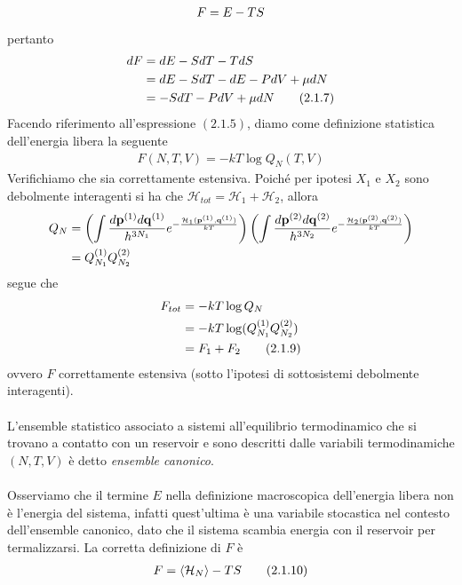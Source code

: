\documentclass{article}
\begin{document}
\begin{align}
    F = E - TS \notag
\end{align}
pertanto 
\begin{align}
    dF &= dE - SdT - TdS \notag \\
    &= dE - SdT -dE - PdV + \mu dN \notag \\
    &= -SdT - PdV + \mu dN \tag{2.1.7}
\end{align}
Facendo riferimento all'espressione $(2.1.5)$, diamo come definizione statistica dell'energia libera la seguente 
\begin{align}
    F(N, T, V) = -kT\log Q_N(T, V) \tag{2.1.8}
\end{align}
Verifichiamo che sia correttamente estensiva. Poiché per ipotesi $X_1$ e $X_2$ sono debolmente interagenti si ha che $\mathcal{H}_{tot} = \mathcal{H}_1 + \mathcal{H}_2$, allora 
\begin{align}
    Q_N &= \left(\int\frac{d\mathbf{p}^{(1)}d\mathbf{q}^{(1)}}{h^{3N_1}}e^{-\frac{\mathcal{H}_1(\mathbf{p}^{(1)}, \mathbf{q}^{(1)})}{kT}}\right)\left(\int\frac{d\mathbf{p}^{(2)}d\mathbf{q}^{(2)}}{h^{3N_2}}e^{-\frac{\mathcal{H}_2(\mathbf{p}^{(2)}, \mathbf{q}^{(2)})}{kT}}\right) \notag \\
    &= Q^{(1)}_{N_1}Q^{(2)}_{N_2} \notag
\end{align}
segue che 
\begin{align}
    F_{tot} &= -kT\log Q_N \notag \\
    &= -kT\log(Q^{(1)}_{N_1}Q^{(2)}_{N_2}) \notag \\
    &= F_1 + F_2 \tag{2.1.9}
\end{align}
ovvero $F$ correttamente estensiva (sotto l'ipotesi di sottosistemi debolmente interagenti). \\ \\
L'ensemble statistico associato a sistemi all'equilibrio termodinamico che si trovano a contatto con un reservoir e sono descritti dalle variabili termodinamiche $(N, T, V)$ è detto \textit{ensemble canonico}. \\ \\
Osserviamo che il termine $E$ nella definizione macroscopica dell'energia libera non è l'energia del sistema, infatti quest'ultima è una variabile stocastica nel contesto dell'ensemble canonico, dato che il sistema scambia energia con il reservoir per termalizzarsi. La corretta definizione di $F$ è 
\begin{align}
    F = \braket{\mathcal{H}_N} - TS \tag{2.1.10}
\end{align}
\end{document}
